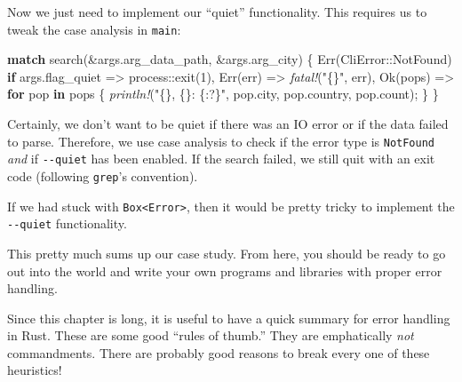 \documentclass[a4paper,]{book}
\newenvironment{Shaded}{\begin{snugshade}}{\end{snugshade}}
\newcommand{\KeywordTok}[1]{\textcolor[rgb]{0.13,0.29,0.53}{\textbf{{#1}}}}
\newcommand{\DecValTok}[1]{\textcolor[rgb]{0.00,0.00,0.81}{{#1}}}
\newcommand{\ConstantTok}[1]{\textcolor[rgb]{0.00,0.00,0.00}{{#1}}}
\newcommand{\StringTok}[1]{\textcolor[rgb]{0.31,0.60,0.02}{{#1}}}
\newcommand{\PreprocessorTok}[1]{\textcolor[rgb]{0.56,0.35,0.01}{\textit{{#1}}}}
\newcommand{\NormalTok}[1]{{#1}}
\begin{document}
Now we just need to implement our ``quiet'' functionality. This requires
us to tweak the case analysis in \texttt{main}:

\begin{Shaded}
\begin{Highlighting}[]
\KeywordTok{match} \NormalTok{search(&args.arg_data_path, &args.arg_city) \{}
    \ConstantTok{Err}\NormalTok{(CliError::NotFound) }\KeywordTok{if} \NormalTok{args.flag_quiet => process::exit(}\DecValTok{1}\NormalTok{),}
    \ConstantTok{Err}\NormalTok{(err) => }\PreprocessorTok{fatal!}\NormalTok{(}\StringTok{"\{\}"}\NormalTok{, err),}
    \ConstantTok{Ok}\NormalTok{(pops) => }\KeywordTok{for} \NormalTok{pop }\KeywordTok{in} \NormalTok{pops \{}
        \PreprocessorTok{println!}\NormalTok{(}\StringTok{"\{\}, \{\}: \{:?\}"}\NormalTok{, pop.city, pop.country, pop.count);}
    \NormalTok{\}}
\NormalTok{\}}
\end{Highlighting}
\end{Shaded}

Certainly, we don't want to be quiet if there was an IO error or if the
data failed to parse. Therefore, we use case analysis to check if the
error type is \texttt{NotFound} \emph{and} if \texttt{-\/-quiet} has
been enabled. If the search failed, we still quit with an exit code
(following \texttt{grep}'s convention).

If we had stuck with \texttt{Box\textless{}Error\textgreater{}}, then it
would be pretty tricky to implement the \texttt{-\/-quiet}
functionality.

This pretty much sums up our case study. From here, you should be ready
to go out into the world and write your own programs and libraries with
proper error handling.


Since this chapter is long, it is useful to have a quick summary for
error handling in Rust. These are some good ``rules of thumb.'' They are
emphatically \emph{not} commandments. There are probably good reasons to
break every one of these heuristics!
\end{document}
